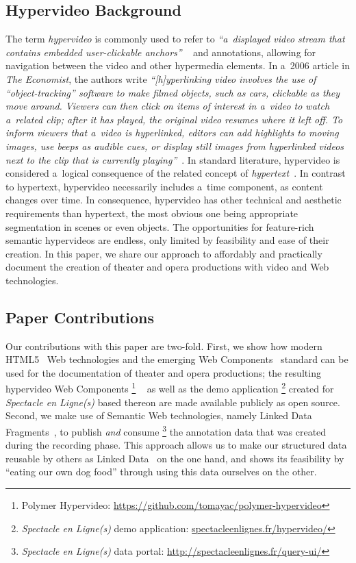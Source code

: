 \documentclass[runningheads,a4paper]{llncs}
\begin{document}
\subsection{Hypervideo Background}

The term \emph{hypervideo} is commonly used to refer to
\textit{``a~displayed video stream that contains embedded user-clickable anchors''}%
~\cite{sawhney1996hypercafe,smith2002extensible}
and annotations, allowing for navigation between the video and other hypermedia elements.
In a~2006 article in \emph{The Economist}, the authors write 
\textit{``[h]yperlinking video involves the use of ``object-tracking'' software
to make filmed objects, such as cars, clickable as they move around.
Viewers can then click on items of interest in a~video
to watch a~related clip; after it has played,
the original video resumes where it left off.
To inform viewers that a~video is hyperlinked,
editors can add highlights to moving images, use beeps as audible cues,
or display still images from hyperlinked videos
next to the clip that is currently playing''}~\cite{economist2006hypervideo}.
In standard literature, hypervideo is considered a~logical consequence
of the related concept of \emph{hypertext}~\cite{bernerslee1990hypertext}.
In contrast to hypertext, hypervideo necessarily includes a~time component,
as content changes over time.
In consequence, hypervideo has other technical and aesthetic requirements
than hypertext, the most obvious one being appropriate segmentation in scenes
or even objects.
The opportunities for feature-rich semantic hypervideos are endless,
only limited by feasibility and ease of their creation.
In this paper, we share our approach to affordably and practically document
the creation of theater and opera productions with video and Web technologies.

\subsection{Paper Contributions}

Our contributions with this paper are two-fold.
First, we show how modern HTML5~\cite{berjon2012html5} Web technologies
and the emerging Web Components~\cite{cooney2013webcomponents} standard
can be used for the documentation of theater and opera productions;
the resulting hypervideo Web Components%
\footnote{Polymer Hypervideo: \url{https://github.com/tomayac/polymer-hypervideo}}%
~\cite{steiner2014hypervideo} as well as the demo application%
\footnote{\emph{Spectacle en Ligne(s)} demo application: \url{spectacleenlignes.fr/hypervideo/}}
created for \emph{Spectacle en Ligne(s)} based thereon
are made available publicly as open source.
Second, we make use of Semantic Web technologies, namely Linked Data Fragments~\cite{verborgh2014ldf},
to publish \emph{and} consume%
\footnote{\emph{Spectacle en Ligne(s)} data portal: \url{http://spectacleenlignes.fr/query-ui/}}
the annotation data that was created during the recording phase.
This approach allows us to make our structured data reusable
by others as Linked Data~\cite{bernerslee2006linkeddata} on the one hand,
and shows its feasibility by ``eating our own dog food'' through using this data ourselves on the other.
\end{document}
